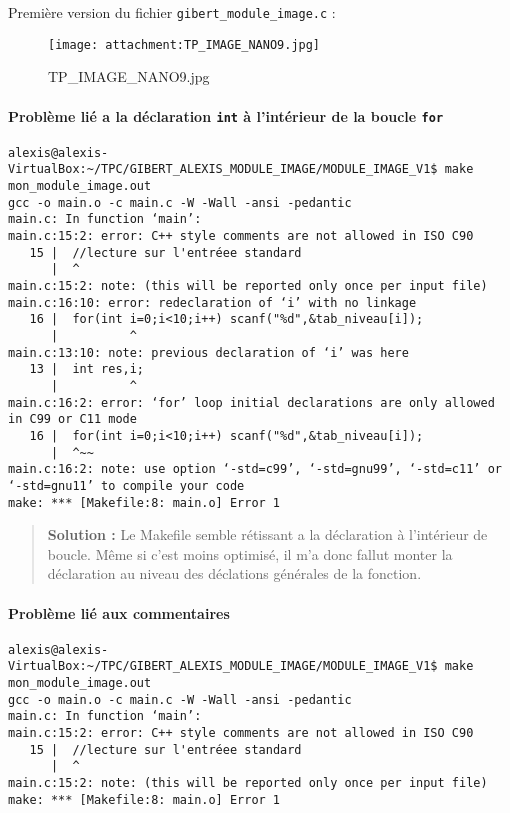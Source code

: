 \documentclass[11pt]{article}
\makeatletter
\def\maxwidth{\ifdim\Gin@nat@width>\linewidth\linewidth
    \else\Gin@nat@width\fi}
\let\Oldincludegraphics\includegraphics
\renewcommand{\includegraphics}[1]{\Oldincludegraphics[width=.8\maxwidth]{#1}}
\makeatother
\begin{document}
Première version du fichier \texttt{gibert\_module\_image.c} :

\begin{figure}
\centering
\texttt{[image: attachment:TP\_IMAGE\_NANO9.jpg]}
\caption{TP\_IMAGE\_NANO9.jpg}
\end{figure}

\paragraph{\texorpdfstring{Problème lié a la déclaration \texttt{int} à
l'intérieur de la boucle
\texttt{for}}{Problème lié a la déclaration int à l'intérieur de la boucle for}}\label{probluxe8me-liuxe9-a-la-duxe9claration-int-uxe0-lintuxe9rieur-de-la-boucle-for}

\begin{verbatim}
alexis@alexis-VirtualBox:~/TPC/GIBERT_ALEXIS_MODULE_IMAGE/MODULE_IMAGE_V1$ make mon_module_image.out
gcc -o main.o -c main.c -W -Wall -ansi -pedantic
main.c: In function ‘main’:
main.c:15:2: error: C++ style comments are not allowed in ISO C90
   15 |  //lecture sur l'entréee standard
      |  ^
main.c:15:2: note: (this will be reported only once per input file)
main.c:16:10: error: redeclaration of ‘i’ with no linkage
   16 |  for(int i=0;i<10;i++) scanf("%d",&tab_niveau[i]);
      |          ^
main.c:13:10: note: previous declaration of ‘i’ was here
   13 |  int res,i;
      |          ^
main.c:16:2: error: ‘for’ loop initial declarations are only allowed in C99 or C11 mode
   16 |  for(int i=0;i<10;i++) scanf("%d",&tab_niveau[i]);
      |  ^~~
main.c:16:2: note: use option ‘-std=c99’, ‘-std=gnu99’, ‘-std=c11’ or ‘-std=gnu11’ to compile your code
make: *** [Makefile:8: main.o] Error 1
\end{verbatim}

\begin{quote}
\textbf{Solution :} Le Makefile semble rétissant a la déclaration à
l'intérieur de boucle. Même si c'est moins optimisé, il m'a donc fallut
monter la déclaration au niveau des déclations générales de la fonction.
\end{quote}

\paragraph{Problème lié aux
commentaires}\label{probluxe8me-liuxe9-aux-commentaires}

\begin{verbatim}
alexis@alexis-VirtualBox:~/TPC/GIBERT_ALEXIS_MODULE_IMAGE/MODULE_IMAGE_V1$ make mon_module_image.out
gcc -o main.o -c main.c -W -Wall -ansi -pedantic
main.c: In function ‘main’:
main.c:15:2: error: C++ style comments are not allowed in ISO C90
   15 |  //lecture sur l'entréee standard
      |  ^
main.c:15:2: note: (this will be reported only once per input file)
make: *** [Makefile:8: main.o] Error 1
\end{verbatim}
\end{document}
